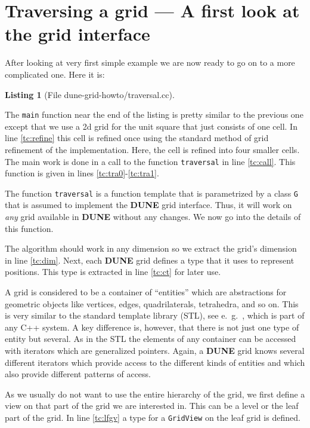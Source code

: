 \documentclass[11pt,a4paper,headinclude,footinclude,DIV16,headings=normal]{scrreprt}
\newcommand{\Dune}{{\sffamily\bfseries DUNE}\xspace}
\newtheorem{lst}{Listing}
\begin{document}
\section{Traversing a grid --- A first look at the grid interface}

After looking at very first simple example we are now ready to go on
to a more complicated one. Here it is:

\begin{lst}[File dune-grid-howto/traversal.cc] \mbox{}
\nopagebreak

\end{lst}

The \lstinline!main! function near the end of the listing is pretty
similar to the previous one except that we use a 2d grid for the unit
square that just consists of one cell. In line \ref{tc:refine} this
cell is refined once using the standard method of grid refinement of
the implementation. Here, the cell is refined into four smaller cells.
The main work is done in a call to the function \lstinline!traversal!
in line \ref{tc:call}.  This function is given in lines
\ref{tc:tra0}-\ref{tc:tra1}.

The function \lstinline!traversal! is a function template that is
parametrized by a class \lstinline!G! that is assumed to implement
the \Dune{} grid interface.  Thus, it will work on \textit{any} grid
available in \Dune{} without any changes. We now go into the details
of this function.

The algorithm should work in any dimension so we extract the grid's
dimension in line \ref{tc:dim}. Next, each \Dune{} grid defines a type
that it uses to represent positions. This type is extracted in line
\ref{tc:ct} for later use.

A grid is considered to be a container of ``entities'' which are
abstractions for geometric objects like vertices, edges,
quadrilaterals, tetrahedra, and so on. This is very similar to the
standard template library (STL), see e.~g.~\cite{Stroustrup},
which is part of any C++ system.
A key difference is, however, that there is not just one type of entity but
several. As in the STL the elements of any container can be accessed
with iterators which are generalized pointers. Again, a \Dune{} grid
knows several different iterators which provide access to the
different kinds of entities and which also provide different patterns
of access.

As we usually do not want to use the entire hierarchy of the grid, we first
define a view on that part of the grid we are interested in. This can be a
level or the leaf part of the grid. In line \ref{tc:lfgv} a type for a
\lstinline!GridView! on the leaf grid is defined.
\end{document}
